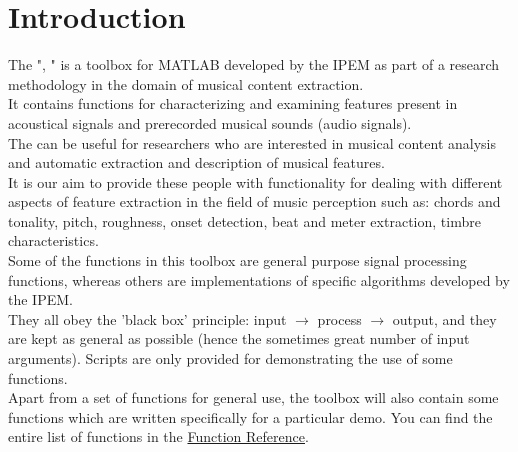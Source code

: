 
\chapter{Introduction}

The "\IPEMShortTitle, \IPEMFullTitle" is a toolbox for MATLAB
developed by the IPEM as part of a research methodology in the
domain of musical content extraction.\\ It contains functions for
characterizing and examining features present in acoustical
signals and prerecorded musical sounds (audio signals).\\

The \IPEMShortTitle can be useful for researchers who are
interested in musical content analysis and automatic extraction
and
description of musical features.\\
It is our aim to provide these people with functionality for
dealing with different aspects of feature extraction in the field
of music perception such as: chords and tonality, pitch,
roughness, onset detection, beat and meter extraction, timbre
characteristics.\\

Some of the functions in this toolbox are general purpose signal
processing functions, whereas others are implementations of
specific algorithms developed by the IPEM.\\
They all obey the 'black box' principle: input $\rightarrow$
process $\rightarrow$ output, and they are kept as general as
possible (hence the sometimes great number of input arguments).
Scripts are only provided for demonstrating the use of some
functions.\\

Apart from a set of functions for general use, the toolbox will
also contain some functions which are written specifically for a
particular demo. You can find the entire list of functions in the
\hyperlink{Chapter:FuncRef}{Function Reference}.

